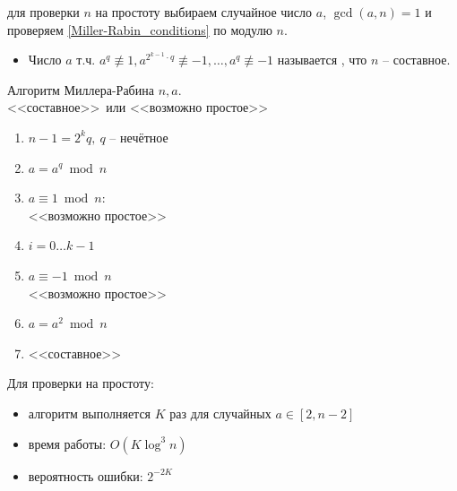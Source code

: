 \documentclass{beamer}
\begin{document}
\begin{frame}
     для проверки $n$ на простоту выбираем случайное число $a$, $\gcd(a,n)=1$ и проверяем \eqref{Miller-Rabin_conditions} по модулю $n$.
    
    \begin{itemize}
        \item Число $a$ т.ч. $a^q \not\equiv 1, a^{2^{k-1} \cdot q} \not\equiv -1, \ldots, a^{q} \not\equiv -1$ называется , что $n$ -- составное.
    \end{itemize}
\end{frame}

\begin{frame}{Алгоритм Миллера-Рабина}
     $n, a$.\\
     <<составное>>~или <<возможно простое>>
    \begin{enumerate}
        \item $n-1 = 2^kq,\ q$ -- нечётное
        \item $a = a^q\bmod n$
        \item {} {$a \equiv 1\bmod n$}:\\
        \quad {} <<возможно простое>>
        \item {} {$i = 0 \ldots k-1$}
        \item \quad {} $a\equiv -1\bmod n$ \\
        \quad \quad {} <<возможно простое>>
        \item \quad $a = a^2\bmod n$
        \item {} <<составное>>
    \end{enumerate}
\end{frame}

\begin{frame}
    Для проверки на простоту:
    \vspace{0.5em}
    \begin{itemize}
        \item алгоритм выполняется $K$ раз для случайных $a \in [2, n-2]$
        \item время работы: $O(K \log^3{n})$
        \item вероятность ошибки: $2^{-2 K}$
    \end{itemize}
\end{frame}
\end{document}
